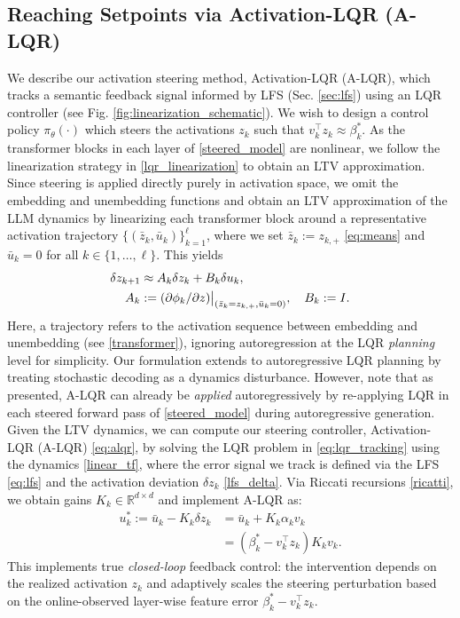 \documentclass{article}
\theoremstyle{plain}
\theoremstyle{definition}
\theoremstyle{remark}
\begin{document}
\subsection{Reaching Setpoints via Activation-LQR (A-LQR)}\label{sec:alqr}
We describe our activation steering method, Activation-LQR (A-LQR), which tracks a semantic feedback signal
informed by LFS (Sec. \ref{sec:lfs}) using an LQR controller (see Fig. \ref{fig:linearization_schematic}). We wish to design a control policy $\pi_\theta(\cdot)$ which steers the activations $z_k$ such that $v_k^\top z_k \approx \beta_k^*$. As the transformer blocks in each layer of \eqref{steered_model} are nonlinear, we follow the linearization strategy in \eqref{lqr_linearization} to obtain an LTV approximation. Since steering is applied directly purely in activation space, we omit the embedding and unembedding functions and obtain an LTV approximation of the LLM dynamics by linearizing each transformer block around a representative activation trajectory $\{(\bar z_k,\bar u_k)\}_{k=1}^\ell$, where we set $\bar z_k := z_{k,+}$ \eqref{eq:means} and $\bar u_k = 0$ for all $k \in \{1,\ldots,\ell\}$. This yields 
\begin{subequations}\label{linear_tf}
\begin{align}
    \hspace{-5pt}\delta z_{k+1} &\approx A_k \delta z_k + B_k\delta u_k,\\
    A_k &:= (\partial \phi_k/\partial z)\big|_{(\bar z_k=z_{k,+},\bar u_k=0)},\quad B_k := I.\hspace{-5pt}\label{eq:linearized_llm}
\end{align}
\end{subequations}
Here, a trajectory refers to the activation sequence between embedding and unembedding (see \eqref{transformer}), ignoring autoregression at the LQR \textit{planning} level for simplicity. 
Our formulation extends to autoregressive LQR planning by treating stochastic decoding as a dynamics disturbance. 
However, note that as presented, A-LQR can already be \textit{applied} autoregressively by re-applying LQR in each steered forward pass of \eqref{steered_model} during autoregressive generation.
Given the LTV dynamics, we can compute our steering controller, Activation-LQR (A-LQR) \eqref{eq:alqr}, by solving the LQR problem in \eqref{eq:lqr_tracking} using the dynamics \eqref{linear_tf}, where the error signal we track is defined via the LFS \eqref{eq:lfs} and the activation deviation $\delta z_k$ \eqref{lfs_delta}. Via Riccati recursions \eqref{ricatti}, we obtain gains $K_k \in \mathbb{R}^{d\times d}$ and implement A-LQR as:
\begin{subequations}\label{eq:alqr}
\begin{align}
    u_k^*:=\bar u_k -K_k \delta z_k &= \bar u_k + K_k \alpha_k v_k \\ 
    &= (\beta_k^* -v_k^\top z_k)K_k v_k.
\end{align}
\end{subequations}
This implements true \textit{closed-loop} feedback control: the intervention depends on the realized activation $z_k$ and adaptively scales the steering perturbation based on the online-observed layer-wise feature error $\beta_k^* - v_k^\top z_k$.
\end{document}
